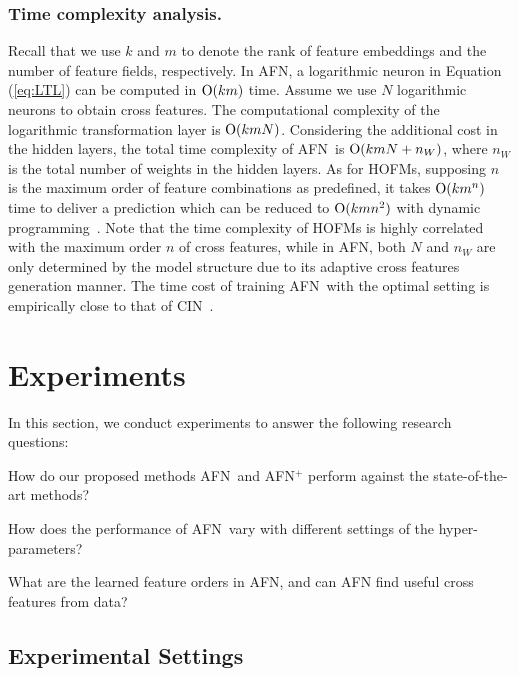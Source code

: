 \documentclass[letterpaper]{article} \usepackage{aaai20}  \usepackage{times}  \usepackage{helvet} \usepackage{courier}  \usepackage[hyphens]{url}  \usepackage{graphicx} \urlstyle{rm} \def\UrlFont{\rm}  \usepackage{graphicx}  \frenchspacing  \setlength{\pdfpagewidth}{8.5in}  \setlength{\pdfpageheight}{11in}
\newcommand{\model}{{AFN}~}
\newcommand{\modelns}{{AFN}}
\begin{document}
\subsubsection{Time complexity analysis.}
Recall that we use $k$ and $m$ to denote the rank of feature embeddings and the number of feature fields, respectively. 
In \modelns, a logarithmic neuron in Equation (\ref{eq:LTL}) can be computed in ${\rm O}(km)$ time. Assume we use $N$ logarithmic neurons to obtain cross features. The computational complexity of the logarithmic transformation layer is ${\rm O}(kmN)$. Considering the additional cost in the hidden layers, the total time complexity of \model is ${\rm O}(kmN+n_W)$, where $n_W$ is the total number of weights in the hidden layers.
As for HOFMs, supposing $n$ is the maximum order of feature combinations as predefined, it takes ${\rm O}(km^n)$ time to deliver a prediction which can be reduced to
${\rm O}(kmn^2)$ with dynamic programming~\cite{hofm}. 
Note that the time complexity of HOFMs is highly correlated with the maximum order $n$ of cross features, while in \modelns, both $N$ and $n_W$ are only determined by the model structure due to its adaptive cross features generation manner. The time cost of training \model with the optimal setting is empirically close to that of CIN~\cite{xDeepFM}.

\section{Experiments}

In this section, we conduct experiments to answer the following research questions:

 How do our proposed methods \model and \modelns$^+$ perform against the state-of-the-art methods?

 How does the performance of \model vary with different settings of the hyper-parameters?

 What are the learned feature orders in \modelns, and can AFN find useful cross features from data?

\subsection{Experimental Settings}
\end{document}
